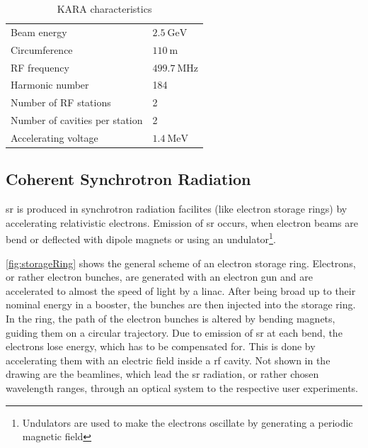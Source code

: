	\begin{table}[tbh]
		\caption{KARA characteristics}
		\label{tab:kara}
		\centering
		\begin{tabularx}{\textwidth}{Xl}
			\toprule
			Beam energy    				& $ \SI{2.5}{\giga \electronvolt}$ \\
			Circumference 	 				& $\SI{110}{\meter}$	  \\
			RF frequency    				& $\SI{499.7}{\mega \hertz}$ 	\\
			Harmonic number 				& 184	\\
			Number of RF stations 			& 2 \\
			Number of cavities per station 	& 2	\\
			Accelerating voltage 					& $\SI{1.4}{\mega \electronvolt}$ \\
			\bottomrule		
		\end{tabularx}
	\end{table}
	\subsection{Coherent Synchrotron Radiation}
	\Gls{sr} is produced in synchrotron radiation facilites (like electron storage rings) by accelerating relativistic electrons.
	Emission of \gls{sr} occurs, when electron beams are bend or deflected with dipole magnets or using an undulator\footnote{Undulators are used to make the electrons oscillate by generating a periodic magnetic field}. 
	
	\autoref{fig:storageRing} shows the general scheme of an electron storage ring.
	Electrons, or rather electron bunches, are generated with an electron gun and are accelerated to almost the speed of light by a \gls{linac}.
	After being broad up to their nominal energy in a booster, the bunches are then injected into the storage ring.
	In the ring, the path of the electron bunches is altered by bending magnets, guiding them on a circular trajectory.
	Due to emission of \gls{sr} at each bend, the electrons lose energy, which has to be compensated for.
	This is done by accelerating them with an electric field inside a \gls{rf} cavity.
	Not shown in the drawing are the beamlines, which lead the \gls{sr} radiation, or rather chosen wavelength ranges, through an optical system to the respective user experiments. \cite{roussel2014} \cite{rota2018}
	
